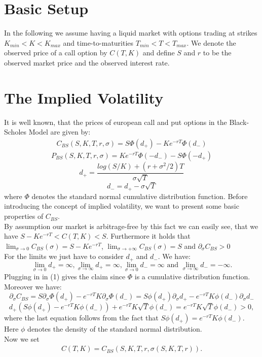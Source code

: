 \documentclass[12pt]{article}
\newcommand{\C}{C_{BS}}
\newcommand{\p}{\partial}
\begin{document}
\section{Basic Setup}
In the following we assume having a liquid market with options trading at strikes $K_{min}<K<K_{max}$ and time-to-maturities $T_{min}<T<T_{max}$. We denote the observed price of a call option by $C(T,K)$ and define $S$ and $r$ to be the observed market price and the observed interest rate.

\section{The Implied Volatility}

It is well known, that the prices of european call and put options in the Black-Scholes Model are given by:
\begin{align}
C_{BS}(S,K,T,r,\sigma)=S\Phi(d_+)-Ke^{-rT}\Phi(d_-)
\end{align}
$$P_{BS}(S,K,T,r,\sigma)=Ke^{-rT}\Phi(-d_-)-S\Phi(-d_+)$$
$$d_+=\frac{log(S/K)+(r+\sigma^2/2)T}{\sigma\sqrt{T}}$$
$$d_-=d_+-\sigma\sqrt{T}$$
where $\Phi$ denotes the standard normal cumulative distribution function.
Before introducing the concept of implied volatility, we want to present some basic properties of $C_{BS}$.\\
By assumption our market is arbitrage-free by this fact we can easily see, that we have $S-Ke^{-rT}<C(T,K)<S$.
Furthermore it holds that $\lim_{\sigma\rightarrow 0}C_{BS}(\sigma)=S-Ke^{-rT}$, $\lim_{\sigma\rightarrow +\infty}C_{BS}(\sigma)=S$ and
$\partial_\sigma C_{BS}>0$\\
For the limits we just have to consider $d_+$ and $d_-$. We have: $$\lim_{\sigma\rightarrow 0} d_+= \infty,\lim_{\sigma\rightarrow \infty} d_+= \infty, \lim_{\sigma\rightarrow 0} d_-= \infty \text{ and }\lim_{\sigma\rightarrow \infty} d_-= -\infty .$$
Plugging in in (1) gives the claim since $\Phi$ is a cumulative distribution function. Moreover we have:
$$\p_\sigma\C=S\p_\sigma\Phi(d_+)-e^{-rT}K\p_\sigma\Phi(d_-)=S\phi(d_+)\p_\sigma d_+-e^{-rT}K\phi(d_-)\p_\sigma d_- $$
$$d_+(S\phi(d_+)-e^{-rT}K\phi(d_-))+e^{-rT}K\sqrt{T}\phi(d_-)=e^{-rT}K\sqrt{T}\phi(d_-)>0,$$
where the last equation follows from the fact that $S\phi(d_+)=e^{-rT}K\phi(d_-)$. Here $\phi$ denotes the density of the standard normal distribution.\\
Now we set
\begin{align}
C(T,K)=\C(S,K,T,r,\sigma(S,K,T,r)).
\end{align}
\end{document}
